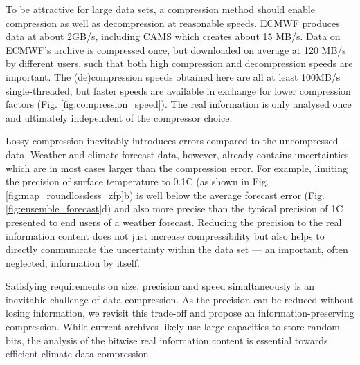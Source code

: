 To be attractive for large data sets, a compression method should enable compression as well as decompression at reasonable speeds.
ECMWF produces data at about 2GB/s, including CAMS which creates about 15 MB/s. Data on ECMWF’s archive is compressed once,
but downloaded on average at 120 MB/s by different users, such that both high compression and decompression speeds are important.
The (de)compression speeds obtained here are all at least 100MB/s single-threaded, but faster speeds
are available in exchange for lower compression factors (Fig. \ref{fig:compression_speed}). The real information is only analysed once
and ultimately independent of the compressor choice.

Lossy compression inevitably introduces errors compared to the uncompressed data. Weather and climate forecast data, however,
already contains uncertainties which are in most cases larger than the compression error. For example, limiting the precision of
surface temperature to 0.1\textdegree{}C (as shown in Fig. \ref{fig:map_roundlossless_zfp}b) is well below the average forecast error
(Fig. \ref{fig:ensemble_forecast}d) and also more precise than the typical precision of 1\textdegree{}C presented to end users of a
weather forecast. Reducing the precision to the real information content does not just increase compressibility but also helps to
directly communicate the uncertainty within the data set — an important, often neglected, information by itself.

Satisfying requirements on size, precision and speed simultaneously is an inevitable challenge of data compression. As the precision
can be reduced without losing information, we revisit this trade-off and propose an information-preserving compression. While current
archives likely use large capacities to store random bits, the analysis of the bitwise real information content is essential towards
efficient climate data compression.


